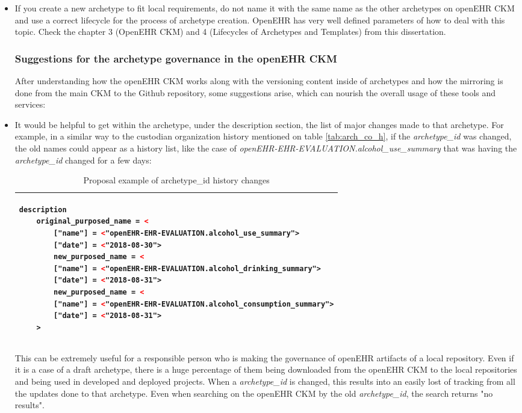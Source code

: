 \documentclass[mim_thesis.tex]{subfiles}
\begin{document}
\begin{itemize}
\item If you create a new archetype to fit local requirements, do not name it with the same name as the other archetypes on openEHR CKM and use a correct lifecycle for the process of archetype creation. OpenEHR has very well defined parameters of how to deal with this topic. Check the chapter 3 (OpenEHR CKM) and 4 (Lifecycles of Archetypes and Templates) from this dissertation.  


\subsubsection{Suggestions for the archetype governance in the openEHR CKM}

After understanding how the openEHR CKM works along with the versioning content inside of archetypes and how the mirroring is done from the main CKM to the Github repository, some suggestions arise, which can nourish the overall usage of these tools and services: 

\item It would be helpful to get within the archetype, under the description section, the list of major changes made to that archetype. For example, in a similar way to the custodian organization history mentioned on table \ref{tab:arch_co_h}, if the \textit{archetype\_id} was changed, the old names could appear as a history list, like the case of \textit{openEHR-EHR-EVALUATION.alcohol\_use\_summary} that was having the \textit{archetype\_id} changed for a few days:

\begin{table}[H]
\caption{Proposal example of archetype\_id history changes}
\label{tab:ngmoduleexample}
\centering
\begin{tabular}{l}
\toprule[2pt]
\begin{lstlisting}[language=XML]
description
	original_purposed_name = <
		["name"] = <"openEHR-EHR-EVALUATION.alcohol_use_summary">
		["date"] = <"2018-08-30">
        new_purposed_name = <
		["name"] = <"openEHR-EHR-EVALUATION.alcohol_drinking_summary">
		["date"] = <"2018-08-31">
        new_purposed_name = <
		["name"] = <"openEHR-EHR-EVALUATION.alcohol_consumption_summary">
		["date"] = <"2018-08-31">
	>

\end{lstlisting}
\tabularnewline \bottomrule[2pt]
\end{tabular}
\end{table}

This can be extremely useful for a responsible person who is making the governance of openEHR artifacts of a local repository. Even if it is a case of a draft archetype, there is a huge percentage of them being downloaded from the openEHR CKM to the local repositories and being used in developed and deployed projects. When a \textit{archetype\_id} is changed, this results into an easily lost of tracking from all the updates done to that archetype. Even when searching on the openEHR CKM by the old \textit{archetype\_id}, the search returns "no results".


\end{itemize}
\end{document}
